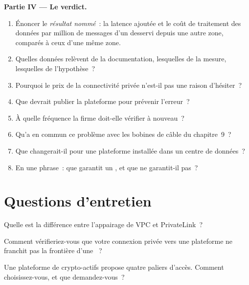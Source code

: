 \begin{problem}
\medskip\noindent\textbf{Partie IV --- Le verdict.}
\begin{enumerate}[resume]
\item Énoncer le \emph{résultat nommé}~: la latence ajoutée et le coût de traitement des données par million de messages d'un  desservi depuis une autre zone,
  comparés à ceux d'une même zone.
\item Quelles données relèvent de la documentation, lesquelles de la mesure, lesquelles de l'hypothèse~?
\item Pourquoi le prix de la connectivité privée n'est-il pas une raison d'hésiter~?
\item Que devrait publier la plateforme pour prévenir l'erreur~?
\item À quelle fréquence la firme doit-elle vérifier à nouveau~?
\item Qu'a en commun ce problème avec les bobines de câble du chapitre~9~?
\item Que changerait-il pour une plateforme installée dans un centre de données~?
\item En une phrase~: que garantit un , et que ne garantit-il pas~?
\end{enumerate}
\end{problem}

\section{Questions d'entretien}

\begin{interviewq}\label{iq:nw:private-connectivity-to-crypto-venues:1}
Quelle est la différence entre l'appairage de VPC et PrivateLink~?
\end{interviewq}

\begin{interviewq}\label{iq:nw:private-connectivity-to-crypto-venues:2}
Comment vérifieriez-vous que votre connexion privée vers une plateforme ne franchit pas la frontière d'une ~?
\end{interviewq}

\begin{interviewq}\label{iq:nw:private-connectivity-to-crypto-venues:3}
Une plateforme de crypto-actifs propose quatre paliers d'accès. Comment choisissez-vous, et que demandez-vous~?
\end{interviewq}

